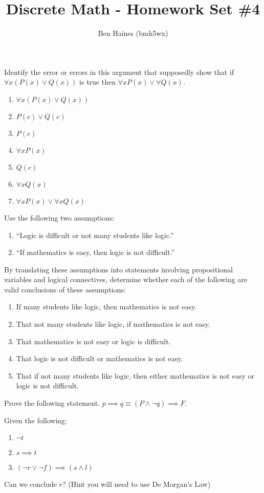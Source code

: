\documentclass[paper=a4, fontsize=11pt]{jhwhw} %
\begin{document}
\title{Discrete Math - Homework Set \#4}
\author{Ben Haines (bmh5wx)}
\problem{}
Identify the error or errors in this argument that supposedly show that if $\forall x(P(x)\lor Q(x))$ is true then $\forall xP(x)\lor \forall Q(x)$.
\begin{enumerate}
\item $\forall x(P(x)\lor Q(x))$
\item $P(c)\lor Q(c)$
\item $P(c)$
\item $\forall xP(x)$
\item $Q(c)$
\item $\forall xQ(x)$
\item $\forall xP(x) \lor \forall xQ(x)$
\end{enumerate}

\solution


\problem{}
Use the following two assumptions:
\begin{enumerate}
\item ``Logic is difficult or not many students like logic.''
\item ``If mathematics is easy, then logic is not difficult.''
\end{enumerate}
By translating these assumptions into statements involving propositional variables and logical connectives, determine whether each of the following are valid conclusions of these assumptions:
\begin{enumerate}
\item If many students like logic, then mathematics is not easy.
\item That not many students like logic, if mathematics is not easy.
\item That mathematics is not easy or logic is difficult.
\item That logic is not difficult or mathematics is not easy.
\item That if not many students like logic, then either mathematics is not easy or logic is not difficult.
\end{enumerate}

\solution



\problem{}
Prove the following statement. $p\implies q \equiv (P\land \neg q) \implies F$.
\solution


\problem{}
Given the following:
\begin{enumerate}
\item $\neg t$
\item $s \implies t$
\item $(\neg r \lor \neg f) \implies (s \land l)$
\end{enumerate}
Can we conclude $r$? (Hint you will need to use De Morgan's Law)
\solution
\end{document}
